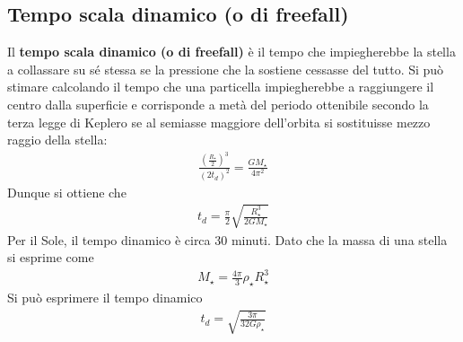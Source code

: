 \documentclass[a4paper, oneside]{book}
\begin{document}
\subsection{Tempo scala dinamico (o di freefall)}
Il \textbf{tempo scala dinamico (o di freefall)} è il tempo che impiegherebbe la stella a collassare su
sé stessa se la pressione che la sostiene cessasse del tutto. Si può stimare calcolando il tempo che una particella 
impiegherebbe a raggiungere il centro dalla superficie e corrisponde a metà del periodo 
ottenibile secondo la terza legge di Keplero se al semiasse maggiore dell'orbita si sostituisse
mezzo raggio della stella:
\begin{gather*}
    \frac{\left(\frac{R_\star}{2}\right)^{3}}{(2 t_d)^{2}} = \frac{GM_\star}{4\pi^{2}}
\end{gather*}
Dunque si ottiene che
\begin{gather*}
    t_d = \frac{\pi}{2}\sqrt{\frac{R_\star^{3}}{2GM_\star}}  
\end{gather*}
Per il Sole, il tempo dinamico è circa 30 minuti. Dato che la massa di una stella si esprime come
\begin{gather*}
    M_\star = \frac{4\pi}{3} \rho_\star R_\star^{3}
\end{gather*}
Si può esprimere il tempo dinamico
\begin{align}
    t_d = \sqrt{\frac{3\pi}{32G\rho_\star}} 
\end{align} 
\end{document}
